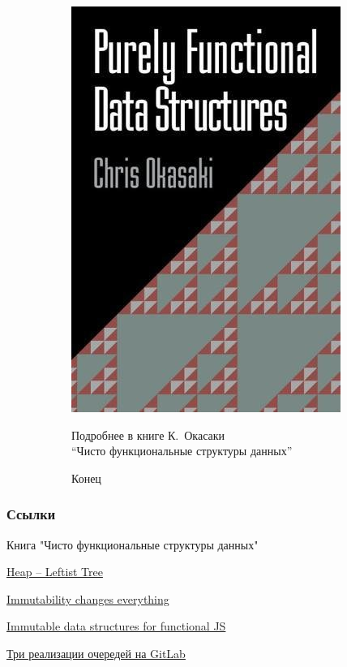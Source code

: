 \documentclass[aspectratio=169
  , xcolor={svgnames}
  , hyperref=
      { colorlinks
      , urlcolor=DarkBlue
      }
  , russian  %
  ]{beamer}
\theoremstyle{exerciseStyle1}
\begin{document}
\begin{frame}
\begin{figure}[ht]
\begin{subfigure}{.4\textwidth}
  \includegraphics[scale=0.5]{okasaki_cover.jpg}
\end{subfigure}
\begin{subfigure}{.55\textwidth}
\begin{center}
  Подробнее в книге К.~Окасаки \\
  ``Чисто функциональные структуры данных'' \\
  \vspace{6em}

  {\Huge Конец}
\end{center}
\end{subfigure}
\end{figure}
\end{frame}


\begin{frame}%
\frametitle<presentation>{Ссылки}
\begin{thebibliography}{10}
  Книга "Чисто функциональные структуры данных"

  \href{http://typeocaml.com/2015/03/12/heap-leftist-tree/}{Heap -- Leftist Tree}

  \href{https://doi.org/10.1145/2857274.2884038}{Immutability changes everything}

  \href{https://www.youtube.com/watch?v=Wo0qiGPSV-s}{Immutable data structures for functional JS}

\href{https://gitlab.com/Kakadu/fp2020course-materials/-/tree/master/code/datatypes}{Три реализации очередей на GitLab}
\end{thebibliography}
\end{frame}
\end{document}
